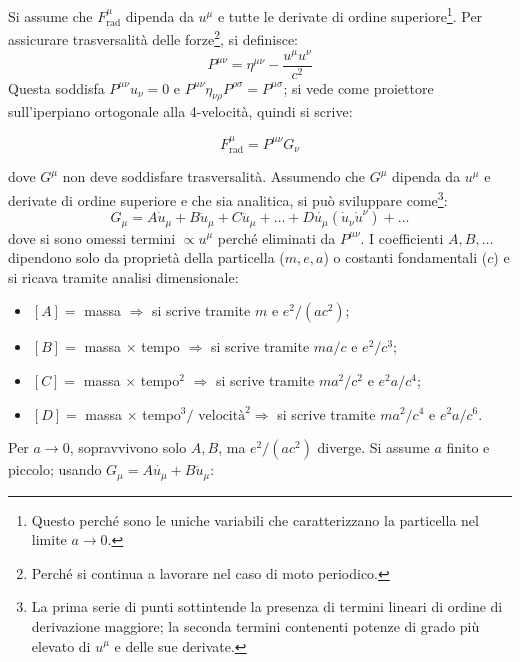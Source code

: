 \documentclass[10pt, a4paper]{scrartcl}
\numberwithin{equation}{subsection}
\theoremstyle{style1}
\newenvironment{boxenv}[1][]{
    \begin{eqbox}[#1]
    }{
   \end{eqbox}
}
\begin{document}
Si assume che $F^\mu _\text{rad}$ dipenda da $u^\mu $ e tutte le derivate di ordine superiore\footnote{Questo perch\'e sono le uniche variabili che caratterizzano la particella nel limite $a\to 0$.}. Per assicurare trasversalit\`a delle forze\footnote{Perch\'e si continua a lavorare nel caso di moto periodico.}, si definisce:
\begin{equation}
	P^{\mu \nu } = \eta^{\mu\nu } - \frac{u^\mu  u^\nu }{c^2}
\end{equation}
Questa soddisfa $P^{\mu \nu } u_\nu =0$ e $P^{\mu \nu } \eta_{\nu \rho } P^{\rho \sigma } = P^{\mu \sigma } $; si vede come proiettore sull'iperpiano ortogonale alla 4-velocit\`a, quindi si scrive:
\begin{boxenv}[]
\begin{equation}
	F^\mu _\text{rad}=P^{\mu \nu } G_\nu 
\end{equation}
\end{boxenv}
\noindent dove $G^\mu $ non deve soddisfare trasversalit\`a. Assumendo che $G^\mu $ dipenda da $u^\mu $ e derivate di ordine superiore e che sia analitica, si pu\`o sviluppare come\footnote{La prima serie di punti sottintende la presenza di termini lineari di ordine di derivazione maggiore; la seconda termini contenenti potenze di grado pi\`u elevato di $u^\mu $ e delle sue derivate.}:
\begin{equation}
	G_\mu = A \dot{u}_\mu  + B \ddot{u}_\mu + C \dddot{u}_\mu + \ldots+ D \dot{u_\mu }(\dot{u}_\nu \dot{u}^\nu )+ \ldots
\end{equation}
dove si sono omessi termini $\propto u^\mu $ perch\'e eliminati da $P^{\mu \nu } $. I coefficienti $A,B,\ldots$ dipendono solo da propriet\`a della particella ($m,e,a$) o costanti fondamentali ($c$) e si ricava tramite analisi dimensionale:
\begin{itemize}
	\item $\left[ A \right] =$ massa $\Rightarrow $ si scrive tramite $m$ e $e^2 / (a c^2)$;
	\item $\left[ B \right] =$ massa $\times $ tempo $\Rightarrow $ si scrive tramite $ma / c$ e $e^2 / c^3$;
	\item $\left[ C \right] =$ massa $\times $ tempo$^2$ $\Rightarrow $ si scrive tramite $ma^2 / c^2$ e $e ^2 a / c^4$;
	\item $\left[ D \right] =$ massa $\times $ tempo$^3 / \text{ velocit\`a}^2 \Rightarrow $ si scrive tramite $ma^2 / c^4 $ e $e^2 a / c^6$.
\end{itemize}
Per $a\to 0$, sopravvivono solo $A,B$, ma $e^2 / (ac^2)$ diverge. Si assume $a$ finito e piccolo; usando $G_\mu  = A \dot{u_\mu }+ B\ddot{u}_\mu $:
\end{document}
